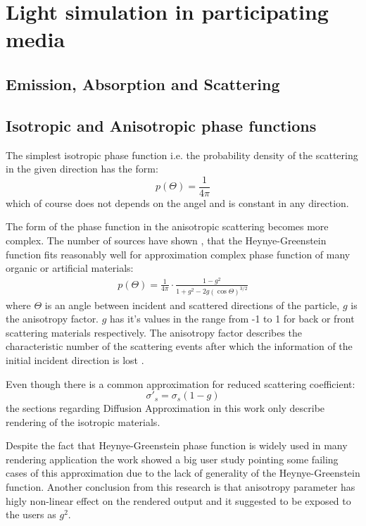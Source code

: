 \section{Light simulation in participating media}
\label{section:light_simulation_theory}
\subsection{Emission, Absorption and Scattering}

\subsection{Isotropic and Anisotropic phase functions}
\label{section:phasefunction}

The simplest isotropic phase function i.e. the probability density of the scattering in the given
direction has the form:
\[
p(\Theta) = \frac{1}{4\pi}
\]
which of course does not depends on the angel and is constant in any direction.

The form of the phase function in the anisotropic scattering becomes more complex. The number of
sources have shown \cite{0031-9155-51-17-N04}, \cite{Gkioulekas:2013:URP:2516971.2516972} that the
Heynye-Greenstein function fits reasonably well for approximation complex phase function of many
organic or artificial materials:
\begin{align}
\label{eq:hg_pdf_theory}
p(\Theta) = \frac{1}{4\pi}\cdot\frac{1-g^2}{1+g^2-2g(\cos{\Theta})^{3/2}}
\end{align}
where $\Theta$ is an angle between incident and scattered directions of the particle, $g$ is the
anisotropy factor. $g$ has it's values in the range from -1 to 1 for back or front scattering
materials respectively. The anisotropy factor describes the characteristic number of the scattering
events after which the information of the initial incident direction is lost
\cite{wang2007biomedical}.

Even though there is a common approximation for reduced scattering coefficient:
\[
\sigma\prime_s = \sigma_s(1 - g)
\]
the sections regarding Diffusion Approximation in this work only describe rendering of the isotropic
materials.

Despite the fact that Heynye-Greenstein phase function is widely used in many rendering application
the work \cite{Gkioulekas:2013:IVR:2508363.2508377} showed a big user study pointing some failing
cases of this approximation due to the lack of generality of the Heynye-Greenstein function. Another
conclusion from this research is that anisotropy parameter has higly non-linear effect on the
rendered output and it suggested to be exposed to the users as $g^2$.

